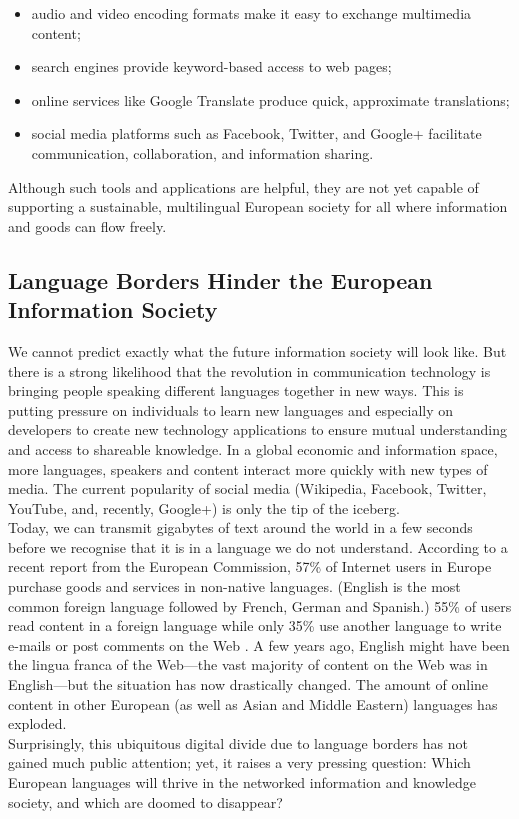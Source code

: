 \begin{multicols}{2}
\begin{itemize}
\item audio and video encoding formats make it easy to exchange multimedia content;

\item search engines provide keyword-based access to web pages;

\item online services like Google Translate produce quick, approximate translations;

\item social media platforms such as Facebook, Twitter, and Google+ facilitate
communication, collaboration, and information sharing.
\end{itemize}

Although such tools and applications are helpful, they are not yet capable of
supporting a sustainable, multilingual European society for all where
information and goods can flow freely.

\subsection{Language Borders Hinder the European Information Society}

We cannot predict exactly what the future information society will
look like.  But there is a strong likelihood that the revolution in
communication technology is bringing people speaking different
languages together in new ways. This is putting pressure on
individuals to learn new languages and especially on developers to
create new technology applications to ensure mutual understanding and
access to shareable knowledge. In a global economic and information
space, more languages, speakers and content interact more quickly with
new types of media. The current popularity of social media (Wikipedia,
Facebook, Twitter, YouTube, and, recently, Google+) is only the tip of
the iceberg.\\
Today, we can transmit gigabytes of text around the world in a few
seconds before we recognise that it is in a language we do not
understand. According to a recent report from the European Commission,
57\% of Internet users in Europe purchase goods and services in
non-native languages. (English is the most
common foreign language followed by French, German and Spanish.) 55\%
of users read content in a foreign language while only 35\% use
another language to write e-mails or post comments on the
Web \cite{EC-prefer}. 
A few years ago, English might have been the
lingua franca of the Web—the vast majority of content on the Web was
in English—but the situation has now drastically changed. The amount
of online content in other European (as well as Asian and Middle
Eastern) languages has exploded.\\
Surprisingly, this ubiquitous digital divide due to language borders
has not gained much public attention; yet, it raises a very pressing
question: Which European languages will thrive in the networked
information and knowledge society, and which are doomed to disappear?


\end{multicols}
